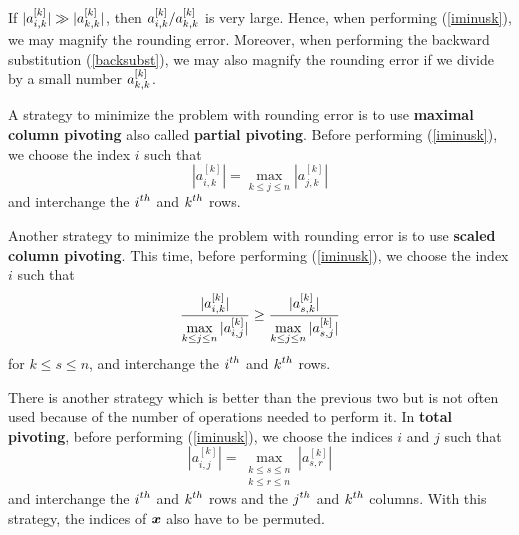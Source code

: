 \begin{rmk}
If $\displaystyle |a^{[k]}_{i,k}| \gg |a^{[k]}_{k,k}|$, then
$\displaystyle a^{[k]}_{i,k} / a^{[k]}_{k,k}$ is very large.  Hence,
when performing (\ref{iminusk}), we may magnify the rounding error.
Moreover, when performing the backward substitution (\ref{backsubst}),
we may also magnify the rounding error if we divide by a small number
$\displaystyle a^{[k]}_{k,k}$.

A strategy to minimize the problem with rounding error is to use
{\bfseries maximal column pivoting}
also called {\bfseries partial pivoting}.
Before performing (\ref{iminusk}), we choose the index $i$ such
that
\[
|a^{[k]}_{i,k}|=\max_{k\leq j \leq n}|a^{[k]}_{j,k}|
\]
and interchange the $\displaystyle i^{th}$ and $\displaystyle k^{th}$ rows.

Another strategy to minimize the problem with rounding error is to use
{\bfseries scaled column pivoting}.
This time, before performing (\ref{iminusk}), we choose the index $i$
such that
\[
\frac{|a^{[k]}_{i,k}|}{\displaystyle \max_{k\leq j \leq n}|a^{[k]}_{i,j}|} \geq
\frac{|a^{[k]}_{s,k}|}{\displaystyle \max_{k\leq j \leq n}|a^{[k]}_{s,j}|}
\]
for $k\leq s \leq n$, and interchange the $\displaystyle i^{th}$
and $\displaystyle k^{th}$ rows.

There is another strategy which is better than the previous two but is
not often used because of the number of operations needed to perform
it.  In {\bfseries total pivoting}, before
performing (\ref{iminusk}), we choose the indices $i$ and $j$ such that
\[
|a^{[k]}_{i,j}|=\max_{\substack{k\leq s \leq n\\k\leq r \leq n}}
|a^{[k]}_{s,r}|
\]
and interchange the $\displaystyle i^{th}$ and $\displaystyle k^{th}$
rows and the $\displaystyle j^{th}$ and
$\displaystyle k^{th}$ columns.  With this strategy, the indices of
$\bm{x}$ also have to be permuted.
\end{rmk}

